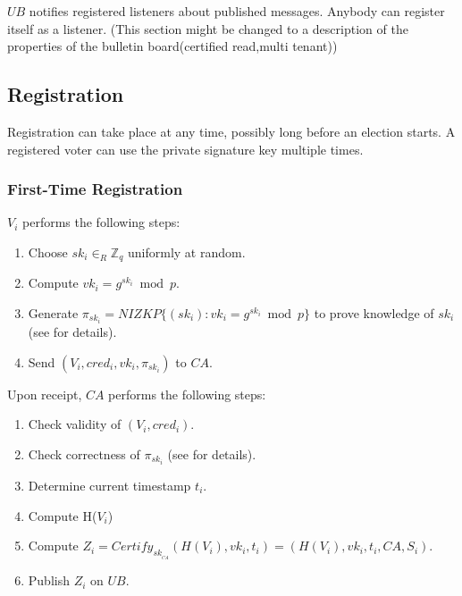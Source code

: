 \documentclass[bibtotoc,halfparskip,oneside]{scrreprt}
\newcommand{\cred}[1]{cred_{#1}\xspace}
\newcommand{\sk}[1]{\mathit{sk}_{#1}\xspace}
\newcommand{\vk}[1]{\mathit{vk}_{#1}\xspace}
\newcommand{\SK}[1]{\sk{_#1}\xspace}
\newcommand{\CA}{\ensuremath{\mathit{CA}}\xspace}
\newcommand{\UB}{\ensuremath{\mathit{UB}}\xspace}
\newcommand{\Voter}[1]{\ensuremath{\mathit{V}_{#1}}\xspace}
\begin{document}
\UB notifies registered listeners about published messages. Anybody can register itself as a listener.
(This section might be changed to a description of the properties of the bulletin board(certified read,multi tenant))

\subsection{Registration}\label{registration}

Registration can take place at any time, possibly long before an election starts. A registered voter can use the private signature key multiple times.

\subsubsection{First-Time Registration}

$\Voter{i}$ performs the following steps:
\begin{enumerate}
	\item Choose $\sk{i}\in_R \mathbb{Z}_q$ uniformly at random.
	\item Compute $\vk{i} = g^{\sk{i}}\bmod{p}$.
	\item Generate $\pi_{\sk{i}}=\mathit{NIZKP}\{(\sk{i}):\vk{i}=g^{\sk{i}}\bmod{p}\}$ to prove knowledge of $\sk{i}$ (see  for details).
	\item Send $(\Voter{i},\cred{i},\vk{i},\pi_{\sk{i}})$ to \CA.
\end{enumerate}

Upon receipt, \CA performs the following steps:
\begin{enumerate}[resume]
	\item Check validity of $(\Voter{i},\cred{i})$.
	\item Check correctness of $\pi_{\sk{i}}$ (see  for details).
	\item Determine current timestamp $t_i$.
	\item Compute H(\Voter{i})
	\item Compute $Z_i=\mathit{Certify}_{\SK{\CA}}(H(\Voter{i}),\vk{i},t_i)=(H(\Voter{i}),\vk{i},t_i,\CA,S_i)$.
	\item Publish $Z_i$ on \UB.
\end{enumerate}
\end{document}
